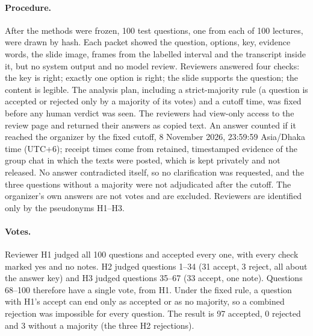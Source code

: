 \paragraph{Procedure.}
After the methods were frozen, 100 test questions, one from each of 100 lectures, were drawn by hash.
Each packet showed the question, options, key, evidence words, the slide image, frames from the labelled interval and the transcript inside it, but no system output and no model review.
Reviewers answered four checks: the key is right; exactly one option is right; the slide supports the question; the content is legible.
The analysis plan, including a strict-majority rule (a question is accepted or rejected only by a majority of its votes) and a cutoff time, was fixed before any human verdict was seen.
The reviewers had view-only access to the review page and returned their answers as copied text.
An answer counted if it reached the organizer by the fixed cutoff, 8 November 2026, 23:59:59 Asia/Dhaka time (UTC+6); receipt times come from retained, timestamped evidence of the group chat in which the texts were posted, which is kept privately and not released.
No answer contradicted itself, so no clarification was requested, and the three questions without a majority were not adjudicated after the cutoff.
The organizer's own answers are not votes and are excluded.
Reviewers are identified only by the pseudonyms H1--H3.

\paragraph{Votes.}
Reviewer H1 judged all 100 questions and accepted every one, with every check marked yes and no notes.
H2 judged questions 1--34 (31 accept, 3 reject, all about the answer key) and H3 judged questions 35--67 (33 accept, one note).
Questions 68--100 therefore have a single vote, from H1.
Under the fixed rule, a question with H1's accept can end only as accepted or as no majority, so a combined rejection was impossible for every question.
The result is 97 accepted, 0 rejected and 3 without a majority (the three H2 rejections).


